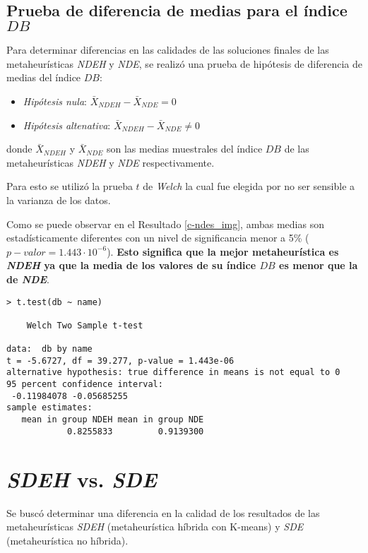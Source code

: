 \subsection{Prueba de diferencia de medias para el índice $DB$}

    Para determinar diferencias en las calidades de las soluciones finales de las
metaheurísticas \emph{NDEH} y \emph{NDE}, se realizó una prueba de hipótesis de
diferencia de medias del índice $DB$:
\begin{itemize}
    \item \emph{Hipótesis nula}: $\bar{X}_{NDEH} - \bar{X}_{NDE} = 0$
    \item \emph{Hipótesis altenativa}: $\bar{X}_{NDEH} - \bar{X}_{NDE} \neq 0$
\end{itemize}
donde $\bar{X}_{NDEH}$ y $\bar{X}_{NDE}$ son las medias muestrales del índice
$DB$ de las metaheurísticas \emph{NDEH} y \emph{NDE} respectivamente.

    Para esto se utilizó la prueba $t$ de \emph{Welch} \cite{AB_0} la cual fue
elegida por no ser sensible a la varianza de los datos.

	Como se puede observar en el Resultado \ref{c-ndes_img}, ambas medias son
estadísticamente diferentes con un nivel de significancia menor a 5\%
($p-valor= 1.443 \cdot 10^{-6}$). { \bf Esto significa que la mejor metaheurística
es \emph{NDEH} ya que la media de los valores de su índice $DB$ es menor que la
de \emph{NDE}}.

\begin{lstlisting}[float=h!, caption={Diferencia de Medias: Índice \emph{DB}}, label=c-ndes_img]
> t.test(db ~ name)

	Welch Two Sample t-test

data:  db by name 
t = -5.6727, df = 39.277, p-value = 1.443e-06
alternative hypothesis: true difference in means is not equal to 0 
95 percent confidence interval:
 -0.11984078 -0.05685255 
sample estimates:
   mean in group NDEH mean in group NDE 
            0.8255833         0.9139300
\end{lstlisting}

\section{\emph{SDEH} vs. \emph{SDE}}

	Se buscó determinar una diferencia en la calidad de los resultados de las
metaheurísticas \emph{SDEH} (metaheurística híbrida con K-means) y
\emph{SDE} (metaheurística no híbrida).

